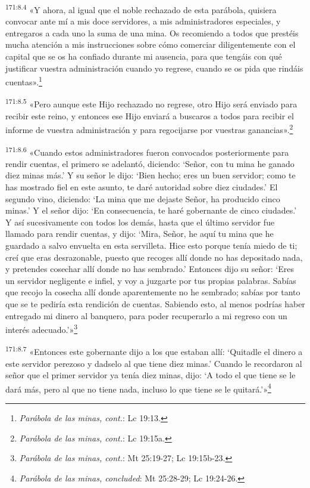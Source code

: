 \par 
\textsuperscript{171:8.4} «Y ahora, al igual que el noble rechazado de esta parábola, quisiera convocar ante mí a mis doce servidores, a mis administradores especiales, y entregaros a cada uno la suma de una mina. Os recomiendo a todos que prestéis mucha atención a mis instrucciones sobre cómo comerciar diligentemente con el capital que se os ha confiado durante mi ausencia, para que tengáis con qué justificar vuestra administración cuando yo regrese, cuando se os pida que rindáis cuentas».\footnote{\textit{Parábola de las minas, cont.}: Lc 19:13.}

\par 
\textsuperscript{171:8.5} «Pero aunque este Hijo rechazado no regrese, otro Hijo será enviado para recibir este reino, y entonces ese Hijo enviará a buscaros a todos para recibir el informe de vuestra administración y para regocijarse por vuestras ganancias».\footnote{\textit{Parábola de las minas, cont.}: Lc 19:15a.}

\par 
\textsuperscript{171:8.6} «Cuando estos administradores fueron convocados posteriormente para rendir cuentas, el primero se adelantó, diciendo: `Señor, con tu mina he ganado diez minas más.' Y su señor le dijo: `Bien hecho; eres un buen servidor; como te has mostrado fiel en este asunto, te daré autoridad sobre diez ciudades.' El segundo vino, diciendo: `La mina que me dejaste Señor, ha producido cinco minas.' Y el señor dijo: `En consecuencia, te haré gobernante de cinco ciudades.' Y así sucesivamente con todos los demás, hasta que el último servidor fue llamado para rendir cuentas, y dijo: `Mira, Señor, he aquí tu mina que he guardado a salvo envuelta en esta servilleta. Hice esto porque tenía miedo de ti; creí que eras desrazonable, puesto que recoges allí donde no has depositado nada, y pretendes cosechar allí donde no has sembrado.' Entonces dijo su señor: `Eres un servidor negligente e infiel, y voy a juzgarte por tus propias palabras. Sabías que recojo la cosecha allí donde aparentemente no he sembrado; sabías por tanto que se te pediría esta rendición de cuentas. Sabiendo esto, al menos podrías haber entregado mi dinero al banquero, para poder recuperarlo a mi regreso con un interés adecuado.'»\footnote{\textit{Parábola de las minas, cont.}: Mt 25:19-27; Lc 19:15b-23.}

\par 
\textsuperscript{171:8.7} «Entonces este gobernante dijo a los que estaban allí: `Quitadle el dinero a este servidor perezoso y dadselo al que tiene diez minas.' Cuando le recordaron al señor que el primer servidor ya tenía diez minas, dijo: `A todo el que tiene se le dará más, pero al que no tiene nada, incluso lo que tiene se le quitará.'»\footnote{\textit{Parábola de las minas, concluded}: Mt 25:28-29; Lc 19:24-26.}

